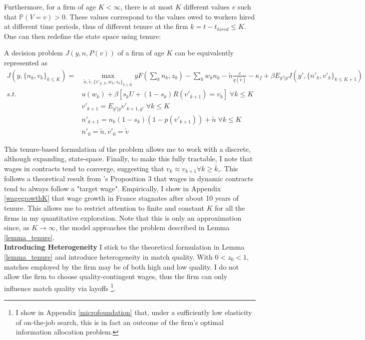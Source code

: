 Furthermore, for a firm of age $K<\infty$, there is at most $K$ different values $v$ such that $\mathbb{P}(V=v)>0$. These values correspond to the values owed to workers hired at different time periods, thus of different tenure at the firm $k=t-t_{hired}\leq K$.  One can then redefine the state space using tenure: 
\begin{lemma} \label{lemma_tenure}
A decision problem $J(y,n,P(v))$ of a firm of age $K$ can be equivalently represented as
\begin{equation*}
    \begin{split}
 J(y,\{n_k,v_k\}_{k\leq K}) =
    & \max_{\tilde{n},\tilde{v},\{v'_{y',k},w_{k},s_{k}\}_{k\leq K}} 
    yF(\sum_k n_k,z_0)-
    \sum_k w_kn_k
    -\tilde{n}\frac{c}{q(\tilde{v})}-\kappa_f
    +\beta E_{y'|y} J(y',\{n'_k,v'_k\}_{k\leq K+1}) \\
     s.t. \: & u(w_k) + \beta [s_k U + (1-s_k)R(v'_{k+1})=v_k] \; \forall k\leq K \\
    & v'_{k+1} = E_{y'|y} v'_{k+1,y'} \; \forall k\leq K \\
    & n'_{k+1} = n_k(1-s_k)(1-p(v'_{k+1}))+\tilde{n}\; \forall k\leq K \\
    & n'_0 = \tilde{n}, v'_0 = \tilde{v}
    \end{split}
\end{equation*}
\end{lemma}
This tenure-based formulation of the problem allows me to work with a discrete, although expanding, state-space. Finally, to make this fully tractable, I note that wages in contracts tend to converge, suggesting that $v_k\approx v_{k+1} \forall k\geq\bar{k}$,. This follows a theoretical result from \textcite{balke2022}'s Proposition 3 that wages in dynamic contracts tend to always follow a "target wage". Empirically, I show in Appendix \ref{wagegrowthK} that wage growth in France stagnates after about 10 years of tenure.  This allows me to restrict attention to finite and constant $K$ for all the firms in my quantitative exploration. Note that this is only an approximation since, as $K\rightarrow\infty$, the model approaches the problem described in Lemma \ref{lemma_tenure}. \\
\textbf{Introducing Heterogeneity}  I stick to the theoretical formulation in Lemma \ref{lemma_tenure} and introduce heterogeneity in match quality. With $0<z_0<1$, matches employed by the firm may be of both high and low quality. I do not allow the firm to choose quality-contingent wages, thus the firm can only influence match quality via layoffs \footnote{I show in Appendix \ref{microfoundation} that, under a sufficiently low elasticity of on-the-job search, this is in fact an outcome of the firm's optimal information allocation problem.}. \\

